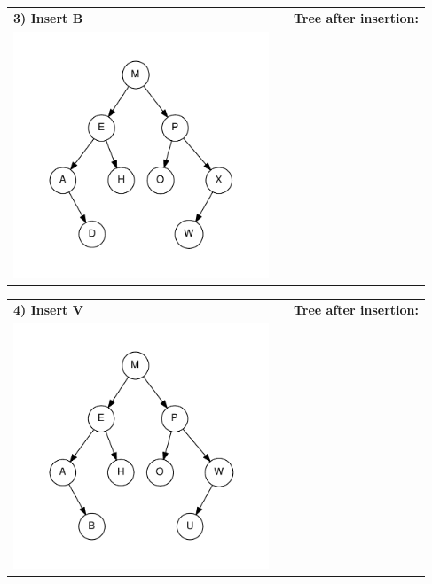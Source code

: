 \documentclass{article}
\begin{document}
\clearpage
{}
\vspace{0.5in}

\noindent\begin{tabular}{lcc}
\bf 3) Insert B & & \bf Tree after insertion: \\
\includegraphics[width=3in]{avl-tree-3} & \hspace{0.5in} & \\
\end{tabular}

\vspace{1.5in}

\noindent\begin{tabular}{lcc}
\bf 4) Insert V & & \bf Tree after insertion: \\
\includegraphics[width=3in]{avl-tree-4} & \hspace{0.5in} & \\
\end{tabular}
\end{document}
